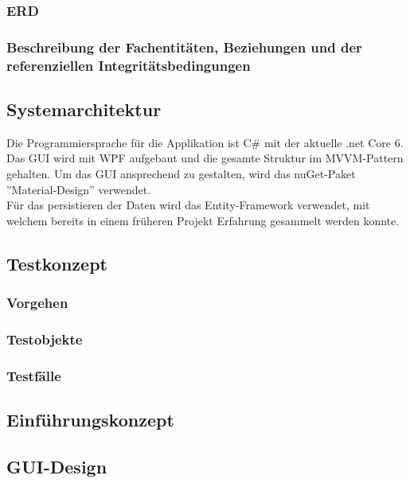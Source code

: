 \subsubsection{ERD}
\subsubsection{Beschreibung der Fachentitäten, Beziehungen und der referenziellen Integritätsbedingungen}
\subsection{Systemarchitektur}
Die Programmiersprache für die Applikation ist C\# mit der aktuelle .net Core 6. Das GUI wird mit WPF aufgebaut und die gesamte Struktur im MVVM-Pattern gehalten. Um das GUI ansprechend zu gestalten, wird das nuGet-Paket ''Material-Design'' verwendet.\\
Für das persistieren der Daten wird das Entity-Framework verwendet, mit welchem bereits in einem früheren Projekt Erfahrung gesammelt werden konnte.
\subsection{Testkonzept} \label{testkonzept}
\subsubsection{Vorgehen}
\subsubsection{Testobjekte}
\subsubsection{Testfälle}
\subsection{Einführungskonzept}
\subsection{GUI-Design}
